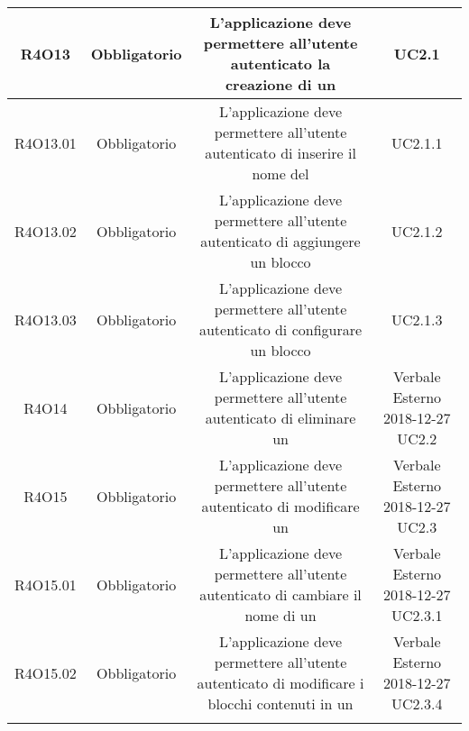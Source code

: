 \begin{tabularx}{\textwidth}{|C|C|C|C|}
	\hline
	R4O13&Obbligatorio&L'applicazione deve permettere all'utente autenticato la creazione di un&  UC2.1\\
	\hline
	R4O13.01&Obbligatorio& L'applicazione deve permettere all'utente autenticato di inserire il nome del  &  UC2.1.1\\
	\hline
	R4O13.02&Obbligatorio&L'applicazione deve permettere all'utente autenticato di aggiungere un blocco &   UC2.1.2\\
	\hline	
	R4O13.03&Obbligatorio&L'applicazione deve permettere all'utente autenticato di configurare un blocco& UC2.1.3\\
	\hline
	R4O14&Obbligatorio&L'applicazione deve permettere all'utente autenticato di eliminare un& Verbale Esterno 2018-12-27 UC2.2\\
	\hline
	R4O15&Obbligatorio& L'applicazione deve permettere all'utente autenticato di  modificare un  &Verbale Esterno 2018-12-27 UC2.3\\
	\hline
	R4O15.01&Obbligatorio& L'applicazione deve permettere all'utente autenticato di cambiare il nome di un  &Verbale Esterno 2018-12-27 UC2.3.1\\
	\hline
	R4O15.02&Obbligatorio& L'applicazione deve permettere all'utente autenticato di modificare i blocchi contenuti in un  &Verbale Esterno 2018-12-27 UC2.3.4\\
	\hline
	\caption{Tabella requisiti di vincolo}
\end{tabularx}

\newpage
